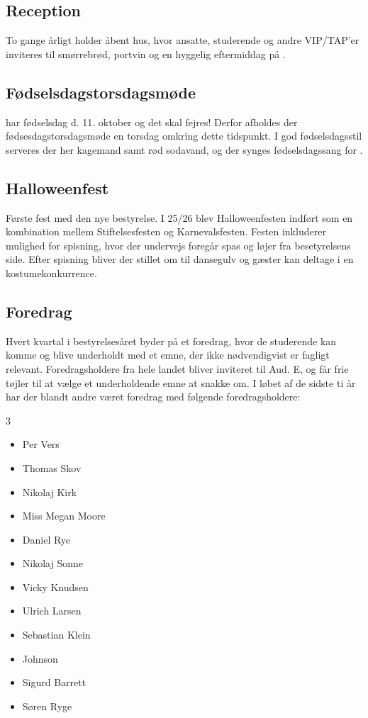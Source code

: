 \subsection{Reception}
To gange årligt holder \TKET åbent hus, hvor ansatte, studerende og andre VIP/TAP'er inviteres til smørrebrød, portvin og en hyggelig eftermiddag på \TKET.
\vspace{-3pt}

\subsection{Fødselsdagstorsdagsmøde}
\TKET har fødselsdag d. 11. oktober og det skal fejres! Derfor afholdes der fødsesdagstorsdagsmøde en torsdag omkring dette tidspunkt. I god fødselsdagsstil serveres der her kagemand samt rød sodavand, og der synges fødselsdagssang for \TKET.

\subsection{Halloweenfest}
Første fest med den nye bestyrelse. I 25/26 blev Halloweenfesten indført som en kombination mellem Stiftelsesfesten og Karnevalsfesten. Festen inkluderer mulighed for spisning, hvor der undervejs foregår spas og løjer fra besetyrelsens side. Efter spisning bliver der stillet om til dansegulv og gæster kan deltage i en kostumekonkurrence.

\subsection{Foredrag}
Hvert kvartal i bestyrelsesåret byder på et foredrag, hvor de studerende kan komme og blive underholdt med et emne, der ikke nødvendigvist er fagligt relevant. Foredragsholdere fra hele landet bliver inviteret til Aud. E, og får frie tøjler til at vælge et underholdende emne at snakke om. I løbet af de sidste ti år har der blandt andre været foredrag med følgende foredragsholdere:

\begin{multicols}{3}
    \begin{itemize}
        \item Per Vers
        \item Thomas Skov
        \item Nikolaj Kirk
        \item Miss Megan Moore
        \item Daniel Rye
        \item Nikolaj Sonne
        \item Vicky Knudsen
        \item Ulrich Larsen
        \item Sebastian Klein
        \item Johnson
        \item Sigurd Barrett
        \item Søren Ryge
    \end{itemize}
\end{multicols}

